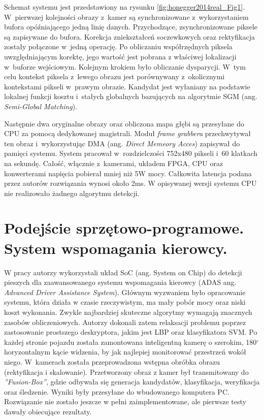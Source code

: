 Schemat systemu jest przedstawiony na rysunku \ref{fig:honegger2014real_Fig1}. 
W~pierwszej kolejności obrazy z~kamer są synchronizowane z~wykorzystaniem bufora opóźniającego jedną linię danych.
Przychodzące, zsynchronizowane piksele są zapisywane do bufora. 
Korekcja zniekształceń soczewkowych oraz rektyfikacja zostały połączone w~jedną operację. 
Po obliczaniu współrzędnych piksela uwzględniającym korektę, jego wartość jest pobrana z właściwej lokalizacji w~buforze wejściowym. 
Kolejnym krokiem było obliczanie dysparycji. 
W~tym celu kontekst piksela z~lewego obrazu jest porównywany z~okolicznymi kontekstami pikseli w~prawym obrazie. 
Kandydat jest wyłaniany na podstawie lokalnej funkcji kosztu i~stałych globalnych bazujących na algorytmie SGM (ang. \textit{Semi-Global Matching}).

Następnie dwa oryginalne obrazy oraz obliczona mapa głębi są przesyłane do CPU za pomocą dedykowanej magistrali.
Moduł \textit{frame grabbera} przechwytywał ten obraz i~wykorzystując DMA (ang. \textit{Direct Memeory Acces}) zapisywał do pamięci systemu.
System pracował w~rozdzielczości 752x480 pikseli i~60 klatkach na sekundę.
Całość, włącznie z~kamerami, układem FPGA, CPU oraz konwerterami napięcia pobierał mniej niż 5W mocy.
Całkowita latencja podana przez autorów rozwiązania wynosi około 2ms. W opisywanej wersji systemu CPU nie realizowało żadnego algorytmu detekcji.


\section{Podejście sprzętowo-programowe. System wspomagania kierowcy.}

W pracy \cite{piao2016real} autorzy wykorzystali układ SoC (ang. System on Chip) do detekcji pieszych dla zaawansowanego systemu wspomagania kierowcy (ADAS ang. \textit{Advanced Driver Assistance System}).
Głównym wyzwaniem było opracowanie systemu, która działa w czasie rzeczywistym, ma mały pobór mocy oraz niski koszt wykonania.
Zwykle najbardziej skuteczne algorytmy wymagają znacznych zasobów obliczeniowych. 
Autorzy dokonali zatem relaksacji problemu poprzez zastosowanie prostszego deskryptora, jakim jest LBP oraz klasyfikatora SVM.
Po każdej stronie pojazdu została zamontowana inteligentną kamerę o szerokim, 180$^\circ$ horyzontalnym kącie widzenia, by jak najlepiej monitorować przestrzeń wokół niego.
W~kamerach została przeprowadzona wstępna obróbka obrazu (rektyfikacja i skalowanie).
Przetworzony obraz z kamer był transmitowany do \textit{''Fusion-Box''}, gdzie odbywała się generacja kandydatów, klasyfikacja, weryfikacja oraz śledzenie.
Wyniki były przesyłane do wbudowanego komputera PC.
Rozwiązanie nie zostało jeszcze w pełni zaimplementowane, ale pierwsze testy dawały obiecujące rezultaty.

